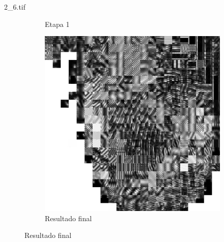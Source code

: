 \documentclass{beamer}
\begin{document}
\begin{frame}{2\_6.tif}
\begin{figure}
\begin{subfigure}[!ht]{0.32\textwidth}
                \caption{Etapa 1}
            \end{subfigure}
            \begin{subfigure}[!ht]{0.32\textwidth}
                \includegraphics[width=\columnwidth]{Fingerprints/2_6_final.jpg}
                \caption{Resultado final}
            \end{subfigure}
        \end{figure}
    \end{frame}
\end{document}
